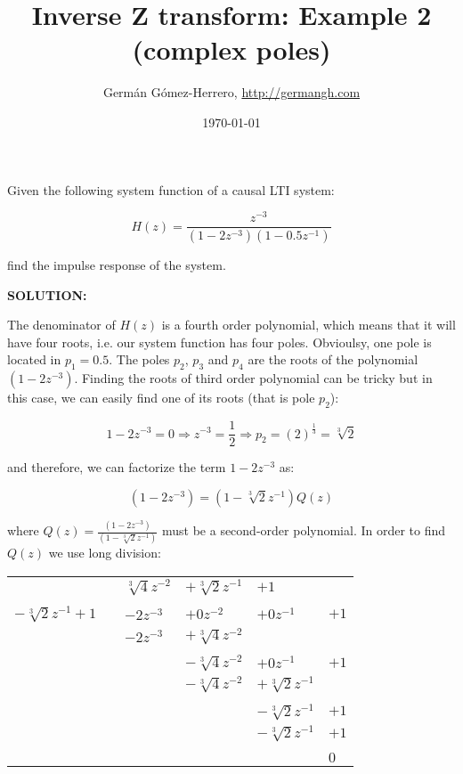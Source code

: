 \documentclass[a4paper,11pt,oneside]{article}
\title{Inverse Z transform: Example 2 (complex poles)}
\date{\today}
\author{Germ\'an G\'omez-Herrero, \url{http://germangh.com}}
\begin{document}
\maketitle

Given the following system function of a causal LTI system:

\begin{equation}\label{eq:systemfunction}
H(z)=\frac{z^{-3}}{(1-2z^{-3})(1-0.5z^{-1})}
\end{equation}

find the impulse response of the system.

\vspace{1cm}

\textbf{SOLUTION:}

The denominator of $H(z)$ is a fourth order polynomial, which means that it will have four roots, i.e. our system function has four poles. Obvioulsy, one pole is located in $p_1=0.5$. The poles $p_2$, $p_3$ and $p_4$ are the roots of the polynomial $(1-2z^{-3})$. Finding the roots of third order polynomial can be tricky but in this case, we can easily find one of its roots (that is pole $p_2$):

\[
1-2z^{-3} = 0 \Rightarrow z^{-3}=\frac{1}{2}  \Rightarrow p_{2}=(2)^{\frac{1}{3}}=\sqrt[3]{2}
\]

and therefore, we can factorize the term $1-2z^{-3}$ as:

\[
(1-2z^{-3})=(1-\sqrt[3]{2}z^{-1})Q(z)
\]

where $Q(z)=\frac{(1-2z^{-3})}{(1-\sqrt[3]{2}z^{-1})}$ must be a second-order polynomial. In order to find $Q(z)$ we use long division:

\begin{tabular}{r|cllll}
&\qquad& $\sqrt[3]{4}z^{-2}$ & $+\sqrt[3]{2}z^{-1}$ & $+1$&\\
\cline{2-6}
\\
$-\sqrt[3]{2}z^{-1}+1$ && $-2z^{-3}$ & $+0z^{-2}$&$+0z^{-1}$&$+1$\\
&& $-2z^{-3}$ & $+\sqrt[3]{4}z^{-2}$&&\\
\cline{3-6}\\
&&&$-\sqrt[3]{4}z^{-2}$&$+0z^{-1}$&$+1$\\
&&&$-\sqrt[3]{4}z^{-2}$&$+\sqrt[3]{2}z^{-1}$&\\
\cline{4-6}\\
&&&&$-\sqrt[3]{2}z^{-1}$&$+1$\\
&&&&$-\sqrt[3]{2}z^{-1}$&$+1$\\
\cline{5-6}\\
&&&&&$0$\\
\end{tabular}
\end{document}
